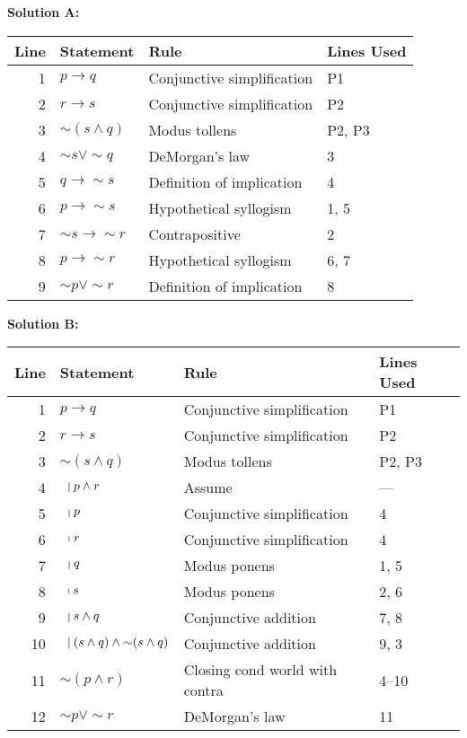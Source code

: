 \documentclass[12pt, letterpaper]{report}
\newcommand{\nott}{{\sim}}
\begin{document}
\begin{enumerate}
\begin{enumerate}
    \textbf{Solution A:}
                
\begin{tabular}{|r|l|l|l|} \hline
Line & Statement & Rule & Lines Used \\ \hline
1 & $p \to q$ & Conjunctive simplification & P1 \\ \hline
2 & $r \to s$ & Conjunctive simplification & P2 \\ \hline
3 & $\nott (s \land q)$ & Modus tollens & P2, P3 \\ \hline
4 & $\nott s \lor \nott q$ & DeMorgan's law & 3 \\ \hline
5 & $q \to \nott s$ & Definition of implication & 4 \\ \hline
6 & $p \to \nott s$ & Hypothetical syllogism & 1, 5 \\ \hline
7 & $\nott s \to \nott r$ & Contrapositive & 2 \\ \hline
8 & $p \to \nott  r$ & Hypothetical syllogism & 6, 7 \\ \hline
9 & $\nott p \lor \nott  r$ & Definition of implication & 8 \\ \hline
\end{tabular}
                
\textbf{Solution B:}
                
\begin{tabular}{|r|l|l|l|} \hline
Line & Statement & Rule & Lines Used \\ \hline
1 & $p \to q$ & Conjunctive simplification & P1 \\ \hline
2 & $r \to s$ & Conjunctive simplification & P2 \\ \hline
3 & $\nott (s \land q)$ & Modus tollens & P2, P3 \\ \hline
4 & $\ \ \vline \ p \land r $& Assume & --- \\ \hline
5 & $\ \ \vline \ p$ & Conjunctive simplification &4 \\ \hline
6 & $\ \ \vline \ r$ & Conjunctive simplification &4 \\ \hline
7 & $\ \ \vline \ q$ & Modus ponens & 1, 5 \\ \hline
8 & $\ \ \vline \ s$ & Modus ponens & 2, 6 \\ \hline
9 & $\ \ \vline \ s \land q$ & Conjunctive addition & 7, 8 \\ \hline
10& $\ \ \vline \ (s \land q) \land \nott (s \land q)$ & Conjunctive addition & 9, 3 \\ \hline
11& $\nott (p \land r)$ & Closing cond world with contra & 4--10  \\ \hline
12& $\nott p \lor \nott r$ & DeMorgan's law & 11  \\ \hline
\end{tabular}


\end{enumerate}
\end{enumerate}
\end{document}
